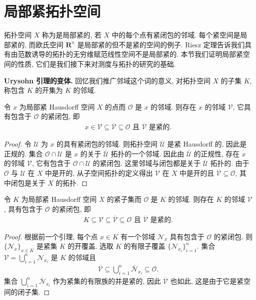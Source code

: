 \documentclass[../../main.tex]{subfiles}
\begin{document}
\section{局部紧拓扑空间}\label{section:ch21-局部紧}

拓扑空间 $X$ 称为是局部紧的, 若 $X$ 中的每个点有紧闭包的邻域. 每个紧空间是局部紧的, 而欧氏空间 $\mathbf{R}^{n}$ 是局部紧的但不是紧的空间的例子. Riesz 定理告诉我们具有由范数诱导的拓扑的无穷维赋范线性空间不是局部紧的. 本节我们证明局部紧空间的性质, 它们是我们接下来对测度与拓扑的研究的基础.

\textbf{Urysohn 引理的变体.} 回忆我们推广邻域这个词的意义, 对拓扑空间 $X$ 的子集 $K$, 称包含 $K$ 的开集为 $K$ 的邻域.

\begin{lemma}\label{lemma:ch21-点邻域紧闭包}
令 $x$ 为局部紧 Hausdorff 空间 $X$ 的点而 $\mathcal{O}$ 是 $x$ 的邻域. 则存在 $x$ 的邻域 $\mathcal{V}$, 它具有包含于 $\mathcal{O}$ 的紧闭包, 即
\begin{align*}
x\in\mathcal{V}\subseteq\overline{\mathcal{V}}\subseteq\mathcal{O}\text{ 且 }\overline{\mathcal{V}}\text{ 是紧的}.
\end{align*}
\end{lemma}

\begin{proof}
令 $\mathcal{U}$ 为 $x$ 的具有紧闭包的邻域. 则拓扑空间 $\overline{\mathcal{U}}$ 是紧 Hausdorff 的, 因此是正规的. 集合 $\mathcal{O}\cap\mathcal{U}$ 是 $x$ 的关于 $\overline{\mathcal{U}}$ 拓扑的一个邻域. 因此由 $\overline{\mathcal{U}}$ 的正规性, 存在 $x$ 的邻域 $\mathcal{V}$, 它有包含于 $\mathcal{O}\cap\mathcal{U}$ 的紧闭包. 这里邻域与闭包都是关于 $\overline{\mathcal{U}}$ 拓扑的. 由于 $\mathcal{O}$ 与 $\mathcal{U}$ 在 $X$ 中是开的, 从子空间拓扑的定义得出 $\mathcal{V}$ 在 $X$ 中是开的且 $\overline{\mathcal{V}}\subseteq\mathcal{O}$, 其中闭包是关于 $X$ 的拓扑.
\end{proof}

\begin{proposition}\label{proposition:ch21-紧集邻域}
令 $K$ 为局部紧 Hausdorff 空间 $X$ 的紧子集而 $\mathcal{O}$ 是 $K$ 的邻域. 则存在 $K$ 的邻域 $\mathcal{V}$, 具有包含于 $\mathcal{O}$ 的紧闭包, 即
\begin{align*}
K\subseteq\mathcal{V}\subseteq\overline{\mathcal{V}}\subseteq\mathcal{O}\text{ 且 }\overline{\mathcal{V}}\text{ 是紧的}.
\end{align*}
\end{proposition}

\begin{proof}
根据前一个引理, 每个点 $x\in K$ 有一个邻域 $\mathcal{N}_{x}$ 具有包含于 $\mathcal{O}$ 的紧闭包. 则 $\{\mathcal{N}_{x}\}_{x\in K}$ 是紧集 $K$ 的开覆盖. 选取 $K$ 的有限子覆盖 $\{\mathcal{N}_{x_{i}}\}_{i=1}^{n}$. 集合 $\mathcal{V}=\bigcup_{i=1}^{n}\mathcal{N}_{x_{i}}$ 是 $K$ 的邻域且
\begin{align*}
\overline{\mathcal{V}}\subseteq\bigcup_{i=1}^{n}\overline{\mathcal{N}}_{x_{i}}\subseteq\mathcal{O}.
\end{align*}
集合 $\bigcup_{i=1}^{n}\overline{\mathcal{N}}_{x_{i}}$ 作为紧集的有限族的并是紧的, 因此 $\overline{\mathcal{V}}$ 也如此, 这是由于它是紧空间的闭子集.
\end{proof}
\end{document}
